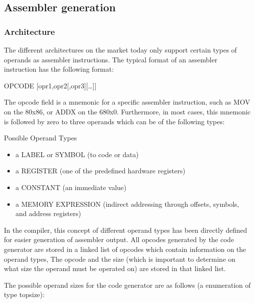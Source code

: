 \documentclass [a4paper,12pt]{article}
\begin{document}
\subsection{Assembler generation}
\label{subsec:mylabel8}

\subsubsection{Architecture}
\label{subsubsec:architectureneration}

The different architectures on the market today only support certain types
of operands as assembler instructions. The typical format of an assembler
instruction has the following format:

\begin{center}
\textsf{OPCODE [opr1,opr2[,opr3][\ldots ]]}
\end{center}

The opcode field is a mnemonic for a specific assembler instruction, such as
\textsf{MOV} on the 80x86, or \textsf{ADDX} on the 680x0. Furthermore, in
most cases, this mnemonic is followed by zero to three operands which can be
of the following types:

Possible Operand Types
\begin{itemize}
\item a LABEL or SYMBOL (to code or data)
\item a REGISTER (one of the predefined hardware registers) 
\item a CONSTANT (an immediate value)
\item a MEMORY EXPRESSION (indirect addressing through offsets, symbols, and
     address registers)
\end{itemize}

In the compiler, this concept of different operand types has been directly
defined for easier generation of assembler output. All opcodes generated by
the code generator are stored in a linked list of opcodes which contain
information on the operand types, The opcode and the size (which is
important to determine on what size the operand must be operated on) are
stored in that linked list.

The possible operand sizes for the code generator are as follows (a
enumeration of type \textsf{topsize}):
\end{document}
